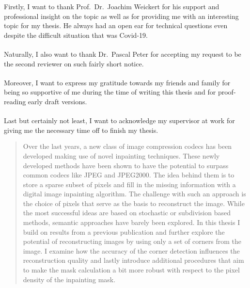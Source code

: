\documentclass[
12pt, %
english, %
onehalfspacing, %
toctotoc, %
nohyperref, %
headsepline, %
chapterinoneline, %
]{MastersDoctoralThesis} %
\begin{document}



\cleardoublepage

\begin{acknowledgements}
    \addchaptertocentry{\acknowledgementname}
    Firstly, I want to thank Prof.\ Dr.\ Joachim Weickert for his support and professional insight
    on the topic as well as for providing me with an interesting topic for my thesis. He always
    had an open ear for technical questions even despite the difficult situation that was
    Covid-19.\\
\\
    \noindent Naturally, I also want to thank Dr.\ Pascal Peter for accepting my
    request to be the second reviewer on such fairly short notice.\\
\\
    \noindent Moreover, I want to express my gratitude towards my friends and family for being 
    so supportive of me during the time of writing this thesis and for proof-reading early
    draft versions.\\
\\
    \noindent Last but certainly not least, I want to acknowledge my supervisor at work for 
    giving me the necessary time off to finish my thesis.
\end{acknowledgements}


\begin{abstract}
    \addchaptertocentry{\abstractname} 
    Over the last years, a new class of image compression codecs has been developed making use of
    novel inpainting techniques. These newly developed methods have been shown to have the
    potential to surpass common codecs like JPEG and JPEG2000. The idea behind them is to store a
    sparse subset of pixels and fill in the missing information with a digital image inpainting 
    algorithm. The challenge with such an approach is the choice of pixels that serve as the basis 
    to reconstruct the image. While the most successful ideas are based on stochastic or
    subdivision based methods, semantic approaches have barely been explored.
    In this thesis I build on results from a previous publication and further explore the potential 
    of reconstructing images by using only a set of corners from the image. I examine how 
    the accuracy of the corner detection influences the reconstruction quality and lastly introduce 
    additional procedures that aim to make the mask calculation a bit more robust with respect to
    the pixel density of the inpainting mask.
\end{abstract}
\end{document}
